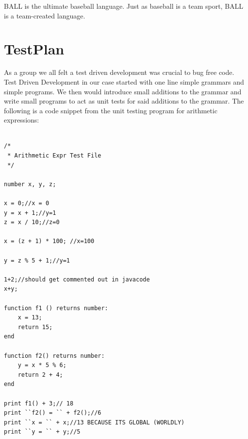 \documentclass[letterpaper,oneside,12pt, pdftex]{report}
\begin{document}
BALL is the ultimate baseball language. Just as baseball is a team
sport, BALL is a team-created language.



\chapter{TestPlan}\label{TestPlan}

As a group we all felt a test driven development was crucial to bug
free code.  Test Driven Development in our case started with one line
simple grammars and simple programs.  We then would introduce small
additions to the grammar and write small programs to act as unit tests
for said additions to the grammar.  The following is a code snippet
from the unit testing program for arithmetic expressions:

\begin{singlespacing}
\begin{verbatim}

/*
 * Arithmetic Expr Test File
 */

number x, y, z;

x = 0;//x = 0
y = x + 1;//y=1
z = x / 10;//z=0

x = (z + 1) * 100; //x=100

y = z % 5 + 1;//y=1

1+2;//should get commented out in javacode
x+y;

function f1 () returns number:
    x = 13;
    return 15;
end

function f2() returns number:
    y = x * 5 % 6;
    return 2 + 4;
end

print f1() + 3;// 18
print ``f2() = `` + f2();//6
print ``x = `` + x;//13 BECAUSE ITS GLOBAL (WORLDLY)
print ``y = `` + y;//5

\end{verbatim}
\end{singlespacing}








\end{document}
